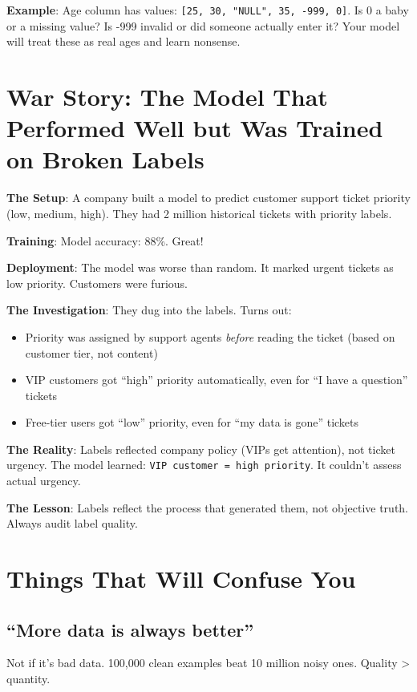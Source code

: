 \documentclass[11pt,oneside]{book}
\begin{document}
\textbf{Example}: Age column has values: \texttt{[25, 30, "NULL", 35, -999, 0]}. Is 0 a baby or a missing value? Is -999 invalid or did someone actually enter it? Your model will treat these as real ages and learn nonsense.

\section{War Story: The Model That Performed Well but Was Trained on Broken Labels}

\textbf{The Setup}: A company built a model to predict customer support ticket priority (low, medium, high). They had 2 million historical tickets with priority labels.

\textbf{Training}: Model accuracy: 88\%. Great!

\textbf{Deployment}: The model was worse than random. It marked urgent tickets as low priority. Customers were furious.

\textbf{The Investigation}: They dug into the labels. Turns out:
\begin{itemize}
\item Priority was assigned by support agents \textit{before} reading the ticket (based on customer tier, not content)
\item VIP customers got ``high'' priority automatically, even for ``I have a question'' tickets
\item Free-tier users got ``low'' priority, even for ``my data is gone'' tickets
\end{itemize}

\textbf{The Reality}: Labels reflected company policy (VIPs get attention), not ticket urgency. The model learned: \texttt{VIP customer = high priority}. It couldn't assess actual urgency.

\textbf{The Lesson}: Labels reflect the process that generated them, not objective truth. Always audit label quality.

\section{Things That Will Confuse You}

\subsection{``More data is always better''}
Not if it's bad data. 100,000 clean examples beat 10 million noisy ones. Quality > quantity.
\end{document}
